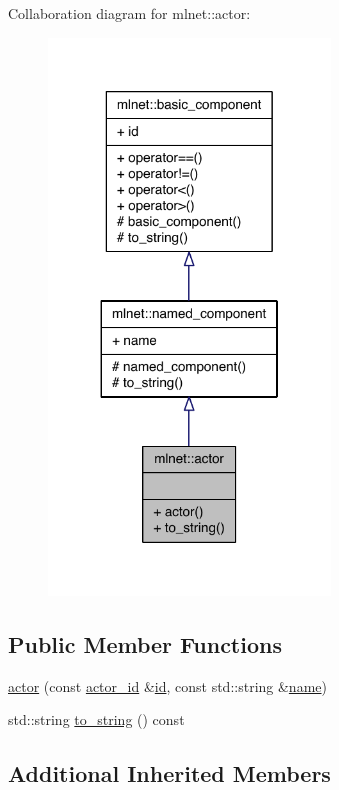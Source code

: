 Collaboration diagram for mlnet\+:\+:actor\+:\nopagebreak
\begin{figure}[H]
\begin{center}
\leavevmode
\includegraphics[width=212pt]{classmlnet_1_1actor__coll__graph}
\end{center}
\end{figure}
\subsection*{Public Member Functions}
\begin{DoxyCompactItemize}
\item 
\hyperlink{classmlnet_1_1actor_ab072eddf0e7e2182749c5cc3d59301b3}{actor} (const \hyperlink{namespacemlnet_a1d557bff46b627f1d7f6ff613302bba5}{actor\+\_\+id} \&\hyperlink{classmlnet_1_1basic__component_a7d56ea959ef686405bc0fa4830b03347}{id}, const std\+::string \&\hyperlink{classmlnet_1_1named__component_a3015f6650729352abae8fb01e7ee7ca7}{name})
\item 
std\+::string \hyperlink{classmlnet_1_1actor_a373ce265db390ecccc181d189520a075}{to\+\_\+string} () const 
\end{DoxyCompactItemize}
\subsection*{Additional Inherited Members}


